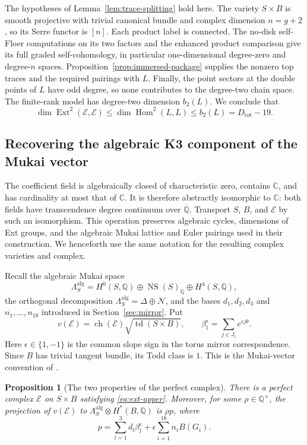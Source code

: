 \documentclass[11pt]{article}
\numberwithin{equation}{section}
\newtheorem{proposition}[theorem]{Proposition}
\theoremstyle{definition}
\theoremstyle{remark}
\newcommand{\Q}{\mathbb Q}
\newcommand{\C}{\mathbb C}
\newcommand{\Ext}{\operatorname{Ext}}
\newcommand{\Hom}{\operatorname{Hom}}
\newcommand{\NS}{\operatorname{NS}}
\newcommand{\td}{\operatorname{td}}
\newcommand{\ch}{\operatorname{ch}}
\begin{document}
The hypotheses of Lemma~\ref{lem:trace-splitting} hold here.  The variety
$S\times B$ is smooth projective with trivial canonical bundle and
complex dimension $n=g+2$, so its Serre functor is $[n]$.
Each product label is connected.  The no-disk self-Floer computations
on its two factors and the enhanced product comparison give its full
graded self-cohomology, in particular one-dimensional degree-zero and
degree-$n$ spaces.  Proposition~\ref{prop:immersed-package} supplies the
nonzero top traces and the required pairings with $L$.
Finally, the point sectors at the double points of $L$ have odd degree,
so none contributes to the degree-two chain space.  The finite-rank
model has degree-two dimension $b_2(L)$.  We conclude that
\begin{equation}
 \dim\Ext^2(\mathcal E,\mathcal E)
      \leq \dim\Hom^2(L,L)
      \leq b_2(L)=D_{\mathrm{tot}}-19.
 \label{eq:ext-upper}
\end{equation}

\subsection{Recovering the algebraic K3 component of the Mukai vector}

The coefficient field is algebraically closed of characteristic zero,
contains $\C$, and has cardinality at most that of $\C$.
It is therefore abstractly isomorphic to $\C$: both fields have
transcendence degree continuum over $\overline{\Q}$.
Transport $S$, $B$, and $\mathcal E$ by such an isomorphism.
This operation preserves algebraic cycles, dimensions of Ext groups,
and the algebraic Mukai lattice and Euler pairings used in their
construction.  We henceforth use the same notation for the resulting
complex varieties and complex.

Recall the algebraic Mukai space
\[
 \Lambda_S^{\mathrm{alg}}
       =H^0(S,\Q)\oplus\NS(S)_\Q\oplus H^4(S,\Q),
\]
the orthogonal decomposition
$\Lambda_S^{\mathrm{alg}}=\Delta\oplus\mathcal N$, and the bases
$d_1,d_2,d_3$ and $n_1,\ldots,n_{18}$ introduced in
Section~\ref{sec:mirror}.  Put
\[
 v(\mathcal E)=\ch(\mathcal E)\sqrt{\td(S\times B)},
 \qquad
 \beta_l^{\epsilon}=\sum_{j\in J_l}e^{\epsilon j\theta}.
\]
Here $\epsilon\in\{1,-1\}$ is the common slope sign in the torus
mirror correspondence.  Since $B$ has trivial tangent bundle, its
Todd class is $1$.  This is the Mukai-vector convention of
\cite[Definition~2.1 and Proposition~2.2]{History:Mukai}.

\begin{proposition}[The two properties of the perfect complex]
\label{prop:perfect-complex}
There is a perfect complex $\mathcal E$ on $S\times B$ satisfying
\eqref{eq:ext-upper}.  Moreover, for some $\rho\in\Q^\times$, the
projection of $v(\mathcal E)$ to
$\Lambda_S^{\mathrm{alg}}\otimes H^*(B,\Q)$ is $\rho p$, where
\begin{equation}
            p=\sum_{l=1}^3d_l\beta_l^{\epsilon}
                   +\epsilon\sum_{i=1}^{18}n_i B(G_i).
 \label{eq:algebraic-mukai-component}
\end{equation}
\end{proposition}
\end{document}

